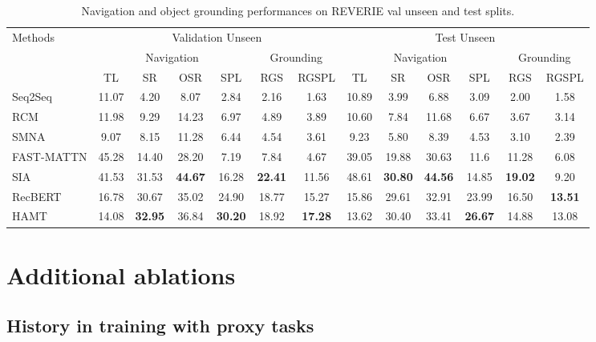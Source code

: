 \begin{table}
\small
\centering
\tabcolsep=0.08cm
\caption{Navigation and object grounding performances on REVERIE val unseen and test splits.}
\label{tab:supp_reverie_cmpr}
\begin{tabular}{lcccccccccccc} \toprule
\multirow{3}{*}{Methods} & \multicolumn{6}{c}{Validation Unseen} & \multicolumn{6}{c}{Test Unseen} \\
\multicolumn{1}{c}{} & \multicolumn{4}{c}{Navigation} & \multicolumn{2}{c}{Grounding} & \multicolumn{4}{c}{Navigation} & \multicolumn{2}{c}{Grounding}  \\ 
 & TL & SR & OSR & SPL & RGS & RGSPL & TL & SR & OSR & SPL & RGS & RGSPL \\ \midrule Seq2Seq \cite{anderson2018vision} & 11.07 & 4.20 & 8.07 & 2.84 & 2.16 & 1.63 & 10.89 & 3.99 & 6.88 & 3.09 & 2.00 & 1.58 \\
RCM \cite{wang2019reinforced} & 11.98 & 9.29 & 14.23 & 6.97 & 4.89 & 3.89  & 10.60 & 7.84 & 11.68 & 6.67 & 3.67 & 3.14 \\
SMNA \cite{ma2019self} & 9.07 & 8.15 & 11.28 & 6.44 & 4.54 & 3.61  & 9.23 & 5.80 & 8.39 & 4.53 & 3.10 & 2.39 \\
FAST-MATTN \cite{qi2020reverie} & 45.28 & 14.40 & 28.20 & 7.19 & 7.84 & 4.67 & 39.05 & 19.88 & 30.63 & 11.6 & 11.28 & 6.08 \\
SIA \cite{lin2021scene} & 41.53 & 31.53 & \textbf{44.67} & 16.28 & \textbf{22.41} & 11.56 & 48.61 & \textbf{30.80} & \textbf{44.56} & 14.85  & \textbf{19.02} & 9.20 \\
RecBERT \cite{hong2020recurrent} & 16.78 & 30.67 & 35.02 & 24.90 & 18.77 & 15.27 & 15.86 & 29.61 & 32.91 & 23.99 & 16.50 & \textbf{13.51} \\ \midrule
HAMT & 14.08 & \textbf{32.95} & 36.84 & \textbf{30.20} & 18.92 & \textbf{17.28} & 13.62 & 30.40 & 33.41 & \textbf{26.67} & 14.88  & 13.08 \\ \bottomrule
\end{tabular}
\end{table}




\section{Additional ablations}
\label{sec:more_ablation_results}
\subsection{History in training with proxy tasks}

